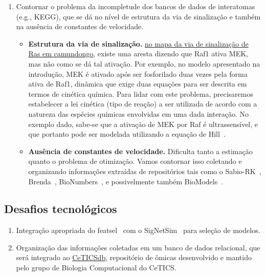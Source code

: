 \documentclass[12pt]{article}
\begin{document}
\begin{enumerate}
\item Contornar o problema da incompletude dos bancos de dados de interatomas (e.g., KEGG), que se dá no nível de estrutura da via de sinalização e também na ausência de constantes de velocidade.
  \begin{itemize}
     \item{\bf Estrutura da via de sinalização.} \href{http://www.genome.jp/kegg-bin/show\_pathway?mmu04014}{no mapa da via de sinalização de Ras em camundongo}, existe uma aresta dizendo que Raf1 ativa MEK, mas não como se dá tal ativação. Por exemplo, no modelo apresentado na introdução, MEK é ativado após ser fosforilado duas vezes pela forma ativa de Raf1, dinâmica que exige duas equações para ser descrita em termos de cinética química. Para lidar com este problema, precisaremos estabelecer a lei cinética (tipo de reação) a ser utilizada de acordo com a natureza das espécies químicas envolvidas em uma dada interação. No exemplo dado, sabe-se que a ativação de MEK por Raf é ultrassensível, e que portanto pode ser modelada utilizando a equação de Hill~\cite{huang1996ultrasensitivity}.
     \item{\bf Ausência de constantes de velocidade.} Dificulta tanto a estimação quanto o problema de otimização. Vamos contornar isso coletando e organizando informações extraídas de repositórios tais como o Sabio-RK~\cite{doi:10.1093/nar/gkr1046}, Brenda~\cite{doi:10.1093/nar/gkh081}, BioNumbers~\cite{milo2009bionumbers}, e possivelmente também  BioModels~\cite{le2006biomodels}. 
  \end{itemize}
\end{enumerate}


\subsection{Desafios tecnológicos}

\begin{enumerate}

%
\item Integração apropriada do featsel~\cite{Reis2017featsel} com o SigNetSim~\cite{Noel2017SigNetSim} para seleção de modelos.

\item Organização das informações coletadas em um banco de dados relacional, que será integrado ao \href{http://cetics.butantan.gov.br/ceticsdb/accounts/login/?next=/ceticsdb/}{CeTICSdb}, repositório de ômicas desenvolvido e mantido pelo grupo de Biologia Computacional do CeTICS.

\end{enumerate}
\end{document}
